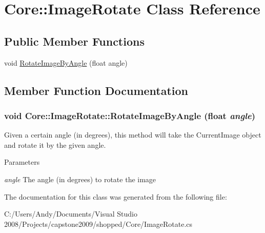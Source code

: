 \hypertarget{class_core_1_1_image_rotate}{
\section{Core::ImageRotate Class Reference}
\label{class_core_1_1_image_rotate}
}
\subsection*{Public Member Functions}
\begin{DoxyCompactItemize}
\item 
void \hyperlink{class_core_1_1_image_rotate_ac83334a7910eff89e63238fb9b3df92b}{RotateImageByAngle} (float angle)
\end{DoxyCompactItemize}


\subsection{Member Function Documentation}
\hypertarget{class_core_1_1_image_rotate_ac83334a7910eff89e63238fb9b3df92b}{
\subsubsection[{RotateImageByAngle}]{\setlength{\rightskip}{0pt plus 5cm}void Core::ImageRotate::RotateImageByAngle (float {\em angle})}}
\label{class_core_1_1_image_rotate_ac83334a7910eff89e63238fb9b3df92b}
Given a certain angle (in degrees), this method will take the CurrentImage object and rotate it by the given angle.


\begin{DoxyParams}{Parameters}
\item[{\em angle}]The angle (in degrees) to rotate the image \end{DoxyParams}


The documentation for this class was generated from the following file:\begin{DoxyCompactItemize}
\item 
C:/Users/Andy/Documents/Visual Studio 2008/Projects/capstone2009/shopped/Core/ImageRotate.cs\end{DoxyCompactItemize}
